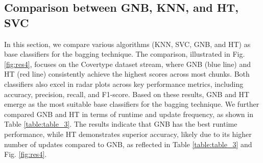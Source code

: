 \begin{table}[t]
	\centering
  \caption{Running time of SENCForest, SENNE, KENNES, and PA.}
	\label{table:table_2}
	\end{table}

\subsection{Comparison between GNB, KNN, and HT, SVC}
\label{sec:compared_base_calssfier}
In this section, we compare various algorithms (KNN, SVC, GNB, and HT) as base classifiers for the bagging technique. The comparison, illustrated in Fig.\ref{fig:res4}, focuses on the Covertype dataset stream, where GNB (blue line) and HT (red line) consistently achieve the highest scores across most chunks. Both classifiers also excel in radar plots across key performance metrics, including accuracy, precision, recall, and F1-score. Based on these results, GNB and HT emerge as the most suitable base classifiers for the bagging technique. We further compared GNB and HT in terms of runtime and update frequency, as shown in Table \ref{table:table_3}. The results indicate that GNB has the best runtime performance, while HT demonstrates superior accuracy, likely due to its higher number of updates compared to GNB, as reflected in Table \ref{table:table_3} and Fig. \ref{fig:res4}.

